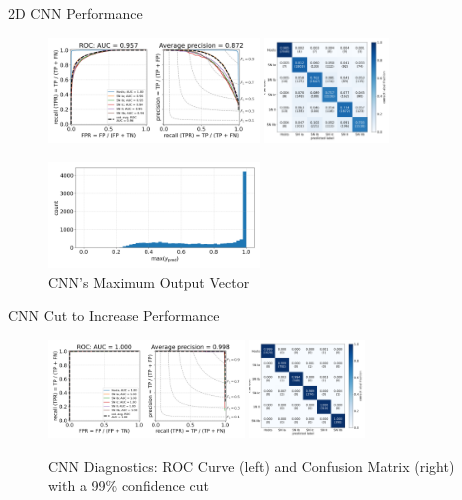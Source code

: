 \begin{frame}{2D CNN Performance}
    \begin{figure}
        \centering
        \includegraphics[height=2.8cm]{figures/cnn/cnn_rocfull.png}
        \quad
        \includegraphics[height=2.8cm]{figures/cnn/cnn_cmfull.png}
        \caption[CNN diagnostics]{CNN Diagnostics: ROC Curve (left) and Confusion Matrix (right)\label{fig:cnn_qual}}

        \includegraphics[width=0.5\textwidth]{figures/cnn/cnn_max_ypred.png}
        \caption{CNN's Maximum Output Vector\label{fig:cnn_max}}
    \end{figure}
\end{frame}

\begin{frame}{CNN Cut to Increase Performance}
    \begin{figure}[b]
        \centering
        \includegraphics[height=2.6cm]{figures/cnn/cnn_roc99.png}
        \quad
        \includegraphics[height=2.6cm]{figures/cnn/cnn_cm99.png}
        \caption[CNN diagnostics with a confidence cut]{CNN Diagnostics: ROC Curve (left) and Confusion Matrix (right) with a 99\% confidence cut\label{fig:cnn_qual2}}
    \end{figure}
\end{frame}


